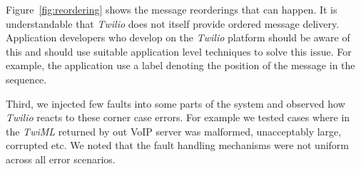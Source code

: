 Figure~\ref{fig:reordering} shows the message reorderings that can happen. It is understandable that \textit{Twilio} does not itself provide ordered message delivery. Application developers who develop on the \textit{Twilio} platform should be aware of this and should use suitable application level techniques to solve this issue. For example, the application use a label denoting the position of the message in the sequence. 

Third, we injected few faults into some parts of the system and observed how \textit{Twilio} reacts to these corner case errors. For example we tested cases where in the \textit{TwiML} returned by out VoIP server was malformed, unacceptably large, corrupted etc. We noted that the fault handling mechanisms were not uniform across all error scenarios.  
